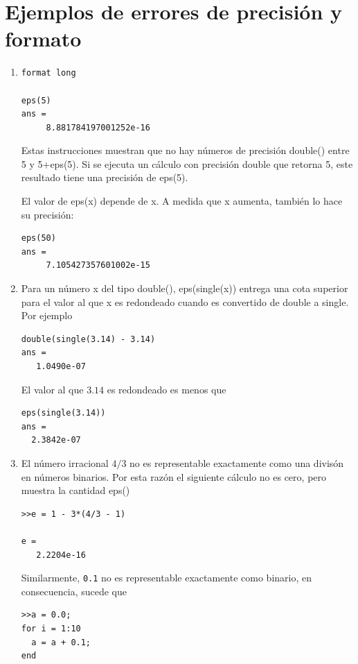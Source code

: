 \documentclass[11pt]{article}
\begin{document}
\section{\textbf{Ejemplos de errores de precisi\'on y formato}}

\begin{enumerate}

\item 
\begin{verbatim}
format long

eps(5)
ans =
     8.881784197001252e-16
\end{verbatim}

Estas instrucciones muestran que no hay n\'umeros de precisi\'on double() entre 5  y 5+eps(5). Si se ejecuta un c\'alculo con precisi\'on double 
que retorna 5, este resultado tiene una precisi\'on de eps(5).

El valor de eps(x) depende de x. A medida que x aumenta, tambi\'en lo hace su precisi\'on:

\begin{verbatim}
eps(50)
ans =
     7.105427357601002e-15
\end{verbatim}

\item  Para un n\'umero x del tipo double(), eps(single(x)) entrega una cota superior para el valor al que x es redondeado cuando es convertido de double a single. Por ejemplo

\begin{verbatim}
double(single(3.14) - 3.14)
ans =
   1.0490e-07
\end{verbatim}
El valor al que $3.14$ es redondeado es menos que 
\begin{verbatim}
eps(single(3.14))
ans =
  2.3842e-07
\end{verbatim}


\item El n\'umero irracional $4/3$ no es representable exactamente como una divis\'on en n\'umeros binarios. Por esta raz\'on el siguiente c\'alculo no es cero, pero muestra la cantidad eps()

\begin{verbatim}
>>e = 1 - 3*(4/3 - 1)

e =
   2.2204e-16
\end{verbatim}

Similarmente, \texttt{0.1} no es representable exactamente como binario, en consecuencia, sucede que 

\begin{verbatim}
>>a = 0.0;
for i = 1:10
  a = a + 0.1;
end


\end{verbatim}
\end{enumerate}
\end{document}
